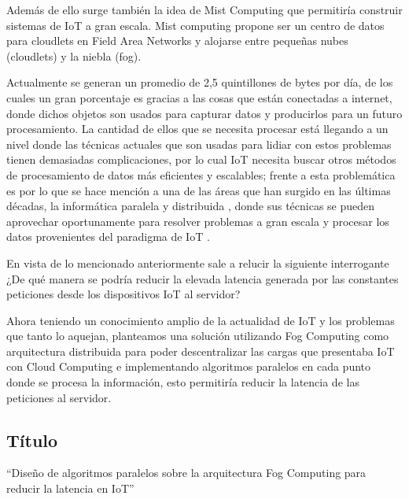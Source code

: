 \vskip 0.3cm
Además de ello surge también la idea de Mist Computing \citep{uehara2017,yogi2017} que permitiría construir sistemas de IoT a gran escala. Mist computing propone ser un centro de datos para cloudlets en Field Area Networks y alojarse entre pequeñas nubes (cloudlets) y la niebla (fog).\par
\vskip 0.3cm
Actualmente se generan un promedio de 2,5 quintillones de bytes por día, de los cuales un gran porcentaje es gracias a las cosas que están conectadas a internet, donde dichos objetos son usados para capturar datos y producirlos para un futuro procesamiento. La cantidad de ellos que se necesita procesar está llegando a un nivel donde las técnicas actuales que son usadas para lidiar con estos problemas tienen demasiadas complicaciones, por lo cual IoT necesita buscar otros métodos de procesamiento de datos más eficientes y escalables; frente a esta problemática es por lo que se hace mención a una de las áreas que han surgido en las últimas décadas, la informática paralela y distribuida \citep{murazzo2017}, donde sus técnicas se pueden aprovechar oportunamente para resolver problemas a gran escala y procesar los datos provenientes del paradigma de IoT \citep{piccialli2018}.\par
\vskip 0.3cm
En vista de lo mencionado anteriormente sale a relucir la siguiente interrogante ¿De qué manera se podría reducir la elevada latencia generada por las constantes peticiones desde los dispositivos IoT al servidor?\par
\vskip 0.3cm
Ahora teniendo un conocimiento amplio de la actualidad de IoT y los problemas que tanto lo aquejan, planteamos una solución utilizando Fog Computing como arquitectura distribuida para poder descentralizar las cargas que presentaba IoT con Cloud Computing e implementando algoritmos paralelos en cada punto donde se procesa la información, esto permitiría reducir la latencia de las peticiones al servidor.\par


\subsection{Título}
“Diseño de algoritmos paralelos sobre la arquitectura Fog Computing para reducir la latencia en IoT”


